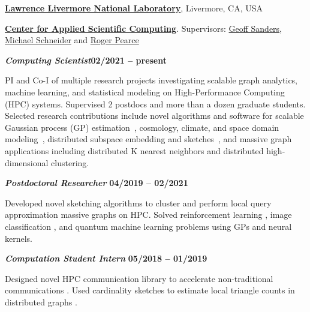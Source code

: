 \href{https://www.llnl.gov/}{\textbf{Lawrence Livermore National Laboratory}},
Livermore, CA, USA

\href{https://computation.llnl.gov/casc/}{\textbf{Center for Applied Scientific Computing}}.
Supervisors:
\href{https://people.llnl.gov/sanders29}{Geoff Sanders},
\href{https://pls.llnl.gov/people/staff-bios/physics/schneider-m}
{Michael Schneider}
and
\href{https://people.llnl.gov/pearce7}{Roger Pearce}

\vspace{-0.5em}

\begin{outerlist}

  \vspace{-0.5em}

  \item[] \textbf{\textit{Computing Scientist}}\hfill \textbf{02/2021 -- present}

  \vspace{-0.5em}

  PI and Co-I of multiple research projects investigating scalable graph
  analytics, machine learning, and statistical modeling on High-Performance
  Computing (HPC) systems.
  Supervised 2 postdocs and more than a dozen graduate students.
  Selected research contributions include novel algorithms and software for
  scalable Gaussian process (GP) estimation~\cite{muyskens2021muygps}, cosmology,
  climate, and space domain modeling~\cite{muyskens2022star}, distributed
  subspace embedding and sketches~\cite{priest2020scaling}, and massive graph
  applications including distributed K nearest neighbors and distributed
  high-dimensional clustering.

  \vspace{-0.5em}

  \item[] \textbf{\textit{Postdoctoral Researcher}}%
  \hfill \textbf{04/2019 -- 02/2021}

  \vspace{-0.5em}

  Developed novel sketching algorithms to cluster \cite{priest2020scaling} and
  perform local query approximation \cite{priest2020degreesketch} massive graphs
  on HPC.
  Solved reinforcement learning \cite{goumiri2020reinforcement}, image
  classification \cite{goumiri2020star}, and quantum machine learning
  \cite{otten2020quantum} problems using GPs and neural kernels.

  \vspace{-0.5em}

  \item[] \textbf{\textit{Computation Student Intern}}%
  \hfill \textbf{05/2018 -- 01/2019}

  \vspace{-0.5em}

  Designed novel HPC communication library to accelerate non-traditional
  communications \cite{priest2019you}.
  Used cardinality sketches to estimate local triangle counts in distributed
  graphs \cite{priest2018estimating}.

\end{outerlist}
